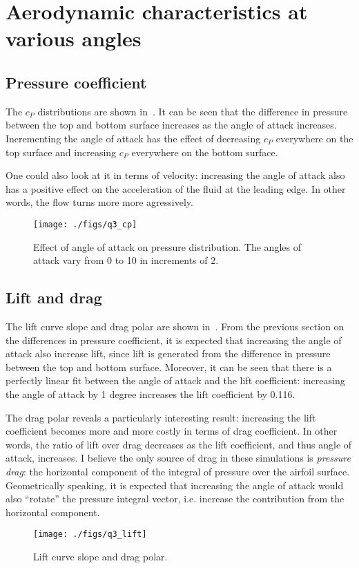 \section{Aerodynamic characteristics at various angles}
\subsection{Pressure coefficient}
The $c_P$ distributions are shown in~. It can be seen that the difference
in pressure between the top and bottom surface increases as the angle of attack increases. Incrementing
the angle of attack has the effect of decreasing $c_P$ everywhere on the top surface and increasing
$c_P$ everywhere on the bottom surface.

One could also look at it in terms of velocity: increasing the angle of attack also has a positive
effect on the acceleration of the fluid at the leading edge. In other words, the flow turns more
more agressively.

\begin{figure}
    \centering
    \texttt{[image: ./figs/q3\_cp]}
    \caption{Effect of angle of attack on pressure distribution. The angles of attack vary from 0 to
        10 in increments of 2.}
    \label{fig:q3_cp}
\end{figure}

\subsection{Lift and drag}
The lift curve slope and drag polar are shown in~. From the previous
section on the differences in pressure coefficient, it is expected that increasing the
angle of attack also increase lift, since lift is generated from the difference in pressure
between the top and bottom surface. Moreover, it can be seen that there is a
perfectly linear fit between the angle of attack and the lift coefficient: increasing
the angle of attack by 1 degree increases the lift coefficient by 0.116.

The drag polar reveals a particularly interesting result: increasing the lift coefficient becomes
more and more costly in terms of drag coefficient. In other words, the ratio of lift over drag
decreases as the lift coefficient, and thus angle of attack, increases. I believe the only source
of drag in these simulations is \textit{pressure drag}: the horizontal
component of the integral of pressure over the airfoil surface. Geometrically speaking, it is expected
that increasing the angle of attack would also ``rotate'' the pressure integral vector, i.e. increase
the contribution from the horizontal component.
\begin{figure}
    \centering
    \texttt{[image: ./figs/q3\_lift]}
    \caption{Lift curve slope and drag polar.}\label{fig:q3_lift}
\end{figure}


